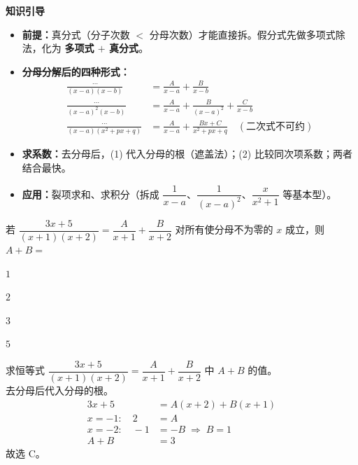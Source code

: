 \documentclass{exam-zh}
\begin{document}
\medskip
\noindent\textbf{知识引导}
\begin{itemize}
  \item \textbf{前提：}真分式（分子次数 $<$ 分母次数）才能直接拆。假分式先做多项式除法，化为 \textbf{多项式 $+$ 真分式}。
  \item \textbf{分母分解后的四种形式：}
  \begin{align*}
    \frac{\cdots}{(x-a)(x-b)} &= \frac{A}{x-a}+\frac{B}{x-b} \\
    \frac{\cdots}{(x-a)^2(x-b)} &= \frac{A}{x-a}+\frac{B}{(x-a)^2}+\frac{C}{x-b} \\
    \frac{\cdots}{(x-a)(x^2+px+q)} &= \frac{A}{x-a}+\frac{Bx+C}{x^2+px+q}\quad(\text{二次式不可约})
  \end{align*}
  \item \textbf{求系数：}去分母后，(1) 代入分母的根（遮盖法）；(2) 比较同次项系数；两者结合最快。
  \item \textbf{应用：}裂项求和、求积分（拆成 $\dfrac{1}{x-a}$、$\dfrac{1}{(x-a)^2}$、$\dfrac{x}{x^2+1}$ 等基本型）。
\end{itemize}

\setcounter{question}{0}

\begin{question}
    若 $\dfrac{3x+5}{(x+1)(x+2)}=\dfrac{A}{x+1}+\dfrac{B}{x+2}$ 对所有使分母不为零的 $x$ 成立，则 $A+B=$ \paren[C]
    \begin{choices}
        \item $1$
        \item $2$
        \item $3$
        \item $5$
    \end{choices}
\end{question}

\begin{solution}
    求恒等式 $\dfrac{3x+5}{(x+1)(x+2)}=\dfrac{A}{x+1}+\dfrac{B}{x+2}$ 中 $A+B$ 的值。 \\
    去分母后代入分母的根。
    \begin{align*}
        3x+5 &= A(x+2)+B(x+1) \\
        x=-1:\quad 2 &= A \\
        x=-2:\quad -1 &= -B \;\Rightarrow\; B=1 \\
        A+B &= 3
    \end{align*}
    故选 C。
\end{solution}
\end{document}
